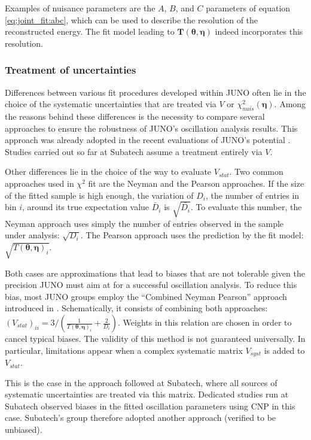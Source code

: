 \documentclass[../main.tex]{subfiles}
\begin{document}
Examples of nuisance parameters are the $A$, $B$, and $C$ parameters of equation \ref{eq:joint_fit:abc}, which can be used to describe the resolution of the reconstructed energy. The fit model leading to $\bm{T}\left(\bm{\theta},\bm{\eta}\right)$ indeed incorporates this resolution.

\subsubsection{Treatment of uncertainties}

Differences between various fit procedures developed within JUNO often lie in the choice of the systematic uncertainties that are treated via $V$ or $\chi^2_{nuis}(\bm{\eta})$. Among the reasons behind these differences is the necessity to compare several approaches to ensure the robustness of JUNO's oscillation analysis results. This approach was already adopted in the recent evaluations of JUNO's potential \cite{abusleme_potential_2024, juno_collaboration_sub-percent_2022}. Studies carried out so far at Subatech assume a treatment entirely via $V$.

Other differences lie in the choice of the way to evaluate $V_{stat}$. Two common approaches used in $\chi^2$ fit are the Neyman and the Pearson approaches. If the size of the fitted sample is high enough, the variation of $D_i$, the number of entries in bin $i$, around its true expectation value $\bar{D}_i$ is $\sqrt{\bar{D_i}}$. To evaluate this number, the Neyman approach uses simply the number of entries observed in the sample under analysis: $\sqrt{D_i}$. The Pearson approach uses the prediction by the fit model: $\sqrt{T(\bm{\theta},\bm{\eta})_i}$.

Both cases are approximations that lead to biases that are not tolerable given the precision JUNO must aim at for a successful oscillation analysis. To reduce this bias, most JUNO groups employ the ``Combined Neyman Pearson'' approach introduced in \cite{ji_combined_2019}. Schematically, it consists of combining both approaches:
$\left(V_{stat}\right)_{ii} = 3/\left(\frac{1}{T(\bm{\theta},\bm{\eta})_i}+\frac{2}{D_i}\right)$.
Weights in this relation are chosen in order to cancel typical biases. The validity of this method is not guaranteed universally. In particular, limitations appear when a complex systematic matrix $V_{syst}$ is added to $V_{stat}$.

This is the case in the approach followed at Subatech, where all sources of systematic uncertainties are treated via this matrix. Dedicated studies run at Subatech observed biases in the fitted oscillation parameters using CNP in this case. Subatech's group therefore adopted another approach (verified to be unbiased).
\end{document}
